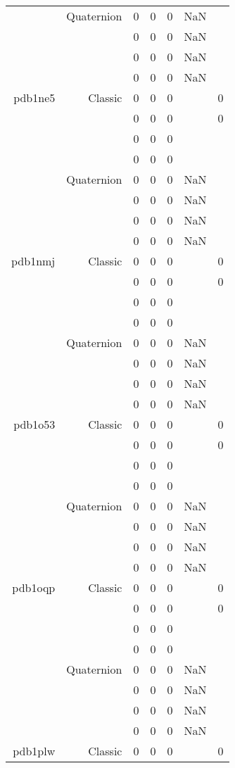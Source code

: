 \begin{xltabular}{\textwidth}{r|rcccSc}
& Quaternion & 0 & 0 & 0 & NaN & \\
& & 0 & 0 & 0 & NaN & \\
& & 0 & 0 & 0 & NaN & \\
& & 0 & 0 & 0 & NaN & \\ \addlinespace
pdb1ne5 & Classic & 0 & 0 & 0 & & 0 \\
& & 0 & 0 & 0 & & 0 \\
& & 0 & 0 & 0 & & \\
& & 0 & 0 & 0 & & \\
& Quaternion & 0 & 0 & 0 & NaN & \\
& & 0 & 0 & 0 & NaN & \\
& & 0 & 0 & 0 & NaN & \\
& & 0 & 0 & 0 & NaN & \\ \addlinespace
pdb1nmj & Classic & 0 & 0 & 0 & & 0 \\
& & 0 & 0 & 0 & & 0 \\
& & 0 & 0 & 0 & & \\
& & 0 & 0 & 0 & & \\
& Quaternion & 0 & 0 & 0 & NaN & \\
& & 0 & 0 & 0 & NaN & \\
& & 0 & 0 & 0 & NaN & \\
& & 0 & 0 & 0 & NaN & \\ \addlinespace
pdb1o53 & Classic & 0 & 0 & 0 & & 0 \\
& & 0 & 0 & 0 & & 0 \\
& & 0 & 0 & 0 & & \\
& & 0 & 0 & 0 & & \\
& Quaternion & 0 & 0 & 0 & NaN & \\
& & 0 & 0 & 0 & NaN & \\
& & 0 & 0 & 0 & NaN & \\
& & 0 & 0 & 0 & NaN & \\ \addlinespace
pdb1oqp & Classic & 0 & 0 & 0 & & 0 \\
& & 0 & 0 & 0 & & 0 \\
& & 0 & 0 & 0 & & \\
& & 0 & 0 & 0 & & \\
& Quaternion & 0 & 0 & 0 & NaN & \\
& & 0 & 0 & 0 & NaN & \\
& & 0 & 0 & 0 & NaN & \\
& & 0 & 0 & 0 & NaN & \\ \addlinespace
pdb1plw & Classic & 0 & 0 & 0 & & 0 \\

\end{xltabular}
